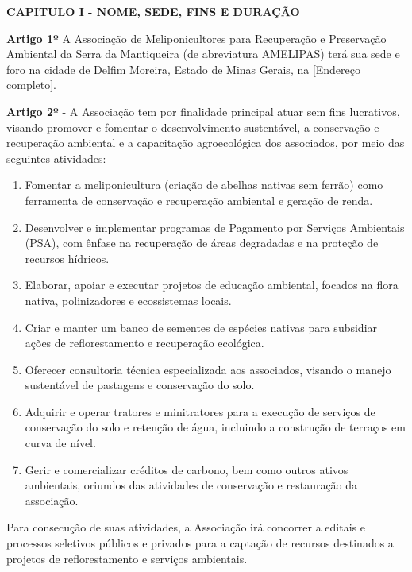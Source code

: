 \documentclass[11pt]{article}
\newcommand{\capitulo}[1]{\begin{center}\fontseries{b}\selectfont\textbf{\MakeUppercase{#1}}\end{center}}
\newcommand{\artigo}[1]{\vspace{1.0em}\noindent\textbf{#1}}
\newcommand{\paragrafo}[1]{\vspace{1.0em}\noindent{#1}}
\newcommand{\titulo}[1]{\begin{center}\fontsize{18}{22}\fontseries{b}\selectfont{#1\\[1.0em]}\end{center}}
\newcommand{\subtitulo}[1]{\begin{center}\fontsize{16}{17}\fontseries{m}\selectfont{#1\\[0.5em]}\end{center}}
\newcommand{\subsubtitulo}[1]{\begin{center}\fontsize{10}{12}\fontseries{m}\selectfont{#1\\[3.0em]}\end{center}}
\begin{document}
\titulo{ESTATUTO SOCIAL}
\subtitulo{Associação de Meliponicultores para Recuperação \\e Preservação Ambiental da Serra da Mantiqueira}\subsubtitulo{CNPJ 12.3456.789/0001-00}


\capitulo{Capitulo I - Nome, Sede, Fins e Duração}

\artigo{Artigo 1º} A Associação de Meliponicultores para Recuperação e Preservação Ambiental da Serra da Mantiqueira (de abreviatura AMELIPAS) terá sua sede e foro na cidade de Delfim Moreira, Estado de Minas Gerais, na [Endereço completo].

\artigo{Artigo 2º} - A Associação tem por finalidade principal atuar sem fins lucrativos, visando promover e fomentar o desenvolvimento sustentável, a conservação e recuperação ambiental e a capacitação agroecológica dos associados, por meio das seguintes atividades:
\begin{enumerate}
  \item Fomentar a meliponicultura (criação de abelhas nativas sem ferrão) como ferramenta de conservação e recuperação ambiental e geração de renda.
  \item Desenvolver e implementar programas de Pagamento por Serviços Ambientais (PSA), com ênfase na recuperação de áreas degradadas e na proteção de recursos hídricos.
  \item Elaborar, apoiar e executar projetos de educação ambiental, focados na flora nativa, polinizadores e ecossistemas locais.
  \item Criar e manter um banco de sementes de espécies nativas para subsidiar ações de reflorestamento e recuperação ecológica.
  \item Oferecer consultoria técnica especializada aos associados, visando o manejo sustentável de pastagens e conservação do solo.
  \item Adquirir e operar tratores e minitratores para a execução de serviços de conservação do solo e retenção de água, incluindo a construção de terraços em curva de nível.
  \item Gerir e comercializar créditos de carbono, bem como outros ativos ambientais, oriundos das atividades de conservação e restauração da associação.
\end{enumerate}

\paragrafo{§ PRIMEIRO} Para consecução de suas atividades, a Associação irá concorrer a editais e processos seletivos públicos e privados para a captação de recursos destinados a projetos de reflorestamento e serviços ambientais.
\end{document}
